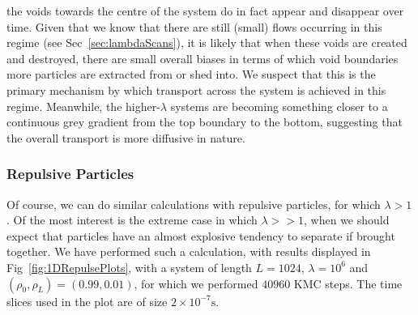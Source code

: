\begin{itemize}
 the voids towards the centre of the system do in fact appear and disappear over time. Given that we know 
 that there are still (small) flows occurring in this regime (see Sec~\ref{sec:lambdaScans}), it is
 likely that when these voids are created and destroyed, there are small overall biases in terms of
 which void boundaries more particles are extracted from or shed into. We suspect that
 this is the primary mechanism by which transport across the system is achieved in this regime. Meanwhile,
 the higher-$\lambda$ systems are becoming something closer to a continuous grey gradient from the top
 boundary to the bottom, suggesting that the overall transport is more diffusive in nature.
\end{itemize}



\subsubsection{Repulsive Particles}
Of course, we can do similar calculations with repulsive particles, for which $\lambda > 1$. Of the most
interest is the extreme case in which $\lambda >> 1$, when we should expect that particles have an almost 
explosive tendency to separate if brought together. We have performed such a calculation, with results
displayed in Fig~\ref{fig:1DRepulsePlots}, with a system
of length $L=1024$, $\lambda = 10^6$ and $(\rho_0 , \rho_L) = (0.99, 0.01)$, for which we performed $40960$
KMC steps. The time slices used in the plot are of size  $2 \times 10^{-7} \mathrm{s}$.
